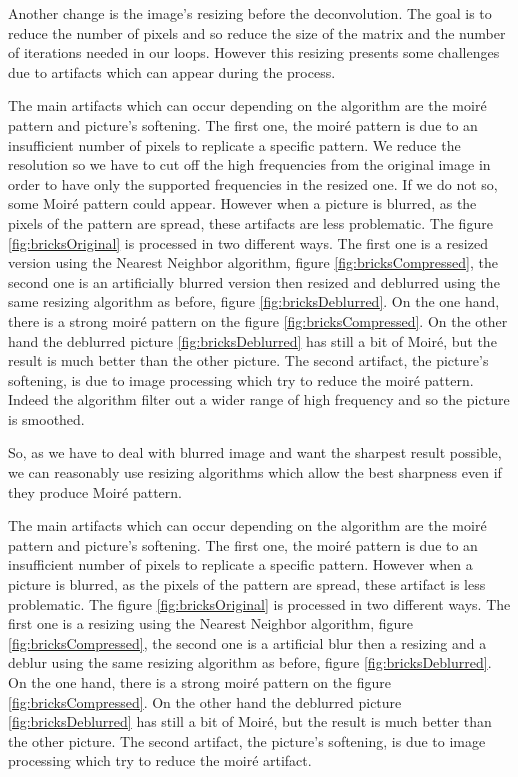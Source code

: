 Another change is the image's resizing before the deconvolution. The goal is to reduce the number of pixels and so reduce the size of the matrix and the number of iterations needed in our loops.  However this resizing presents some challenges due to artifacts which can appear during the process.

The main artifacts which can occur depending on the algorithm are the moiré pattern and picture's softening.  
The first one, the moiré pattern is due to an insufficient number of pixels to replicate a specific pattern. We reduce the resolution so we have to cut off the high frequencies from the original image in order to have only the supported frequencies in the resized one. If we do not so, some Moiré pattern could appear.  However when a picture is blurred, as the pixels of the pattern are spread, these artifacts are less problematic. The figure \ref{fig:bricksOriginal} is processed in two different ways. The first one is a resized version using the Nearest Neighbor algorithm, figure \ref{fig:bricksCompressed}, the second one is an artificially blurred version then resized and deblurred using the same resizing algorithm as before, figure \ref{fig:bricksDeblurred}. On the one hand, there is a strong moiré pattern on the figure \ref{fig:bricksCompressed}. On the other hand the deblurred picture \ref{fig:bricksDeblurred} has still a bit of Moiré, but the result is much better than the other picture. 
The second artifact, the picture's softening, is due to image processing which try to reduce the moiré pattern. Indeed the algorithm filter out a wider range of high frequency and so the picture is smoothed.  

So, as we have to deal with blurred image and want the sharpest result possible, we can reasonably use resizing algorithms which allow the best sharpness even if they produce Moiré pattern. 

The main artifacts which can occur depending on the algorithm are the moiré pattern and picture's softening.
The first one, the moiré pattern is due to an insufficient number of pixels to replicate a specific pattern. However when a picture is blurred, as the pixels of the pattern are spread, these artifact is less problematic. The figure \ref{fig:bricksOriginal} is processed in two different ways. The first one is a resizing using the Nearest Neighbor algorithm, figure \ref{fig:bricksCompressed}, the second one is a artificial blur then a resizing and a deblur using the same resizing algorithm as before, figure \ref{fig:bricksDeblurred}. On the one hand, there is a strong moiré pattern on the figure \ref{fig:bricksCompressed}. On the other hand the deblurred picture \ref{fig:bricksDeblurred} has still a bit of Moiré, but the result is much better than the other picture.
The second artifact, the picture's softening, is due to image processing which try to reduce the moiré artifact.

